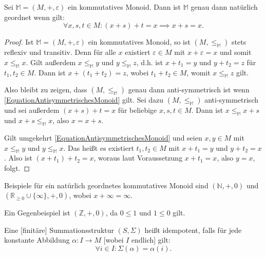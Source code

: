 \documentclass{article}
\begin{document}
\begin{theorem}
  Sei $\mathbb{M} = (M, +, \varepsilon)$ ein kommutatives Monoid.
  Dann ist $\mathbb{M}$ genau dann natürlich geordnet wenn gilt:
  \begin{equation*} \label{EquationAntisymmetrischesMonoid}
    \forall x,s,t \in M \colon (x + s) + t = x \implies x + s = x.\tag{$\ast$}
  \end{equation*}
\end{theorem}
\begin{proof}
  Ist $\mathbb{M} = (M, +, \varepsilon)$ ein kommutatives Monoid, so ist $(M, \leq_\mathbb{M})$ stets reflexiv und transitiv.
  Denn für alle $x$ existiert $\varepsilon \in M$ mit $x + \varepsilon = x$ und somit $x \leq_\mathbb{M} x$.
  Gilt außerdem $x \leq_\mathbb{M} y$ und $y \leq_\mathbb{M} z$, d.h. ist $x + t_1 = y$ und $y + t_2 = z$ für $t_1, t_2 \in M$. 
  Dann ist $x + (t_1 + t_2) = z$, wobei $t_1 + t_2 \in M$, womit $x \leq_\mathbb{M} z$ gilt.

  Also bleibt zu zeigen, dass $(M, \leq_\mathbb{M})$ genau dann anti-symmetrisch ist wenn \eqref{EquationAntisymmetrischesMonoid} gilt.
  Sei dazu $(M, \leq_\mathbb{M})$ anti-symmetrisch und sei außerdem $(x + s) + t = x$ für beliebige $x,s,t \in M$.
  Dann ist $x \leq_\mathbb{M} x+ s$ und $x + s \leq_\mathbb{M} x$, also $x = x + s$.

  Gilt umgekehrt \eqref{EquationAntisymmetrischesMonoid} und seien $x,y \in M$ mit $x \leq_\mathbb{M} y$ und $y \leq_\mathbb{M} x$.
  Das heißt es existiert $t_1, t_2 \in M$ mit $x + t_1 = y$ und $y + t_2 = x$.
  Also ist $(x + t_1) + t_2 = x$, woraus laut Voraussetzung $x + t_1 = x$, also $y = x$, folgt.
\end{proof}

\begin{example}
  Beispiele für ein natürlich geordnetes kommutatives Monoid sind $(\mathbb{N}, +, 0)$ und $(\mathbb{R}_{\geq 0} \cup \{\infty\}, +, 0)$, wobei
  $x + \infty = \infty$.

  Ein Gegenbeispiel ist $(\mathbb{Z}, +, 0)$, da $0 \leq 1$ und $1 \leq 0$ gilt.
\end{example}

\begin{definition}
  Eine [finitäre] Summationsstruktur $(S, \Sigma)$ heißt idempotent, falls für jede konstante Abbildung
  $\alpha \colon I \to M$ [wobei $I$ endlich] gilt:
  \begin{equation*}
    \forall i \in I \colon \Sigma(\alpha) = \alpha(i).
  \end{equation*}
\end{definition}
\end{document}
